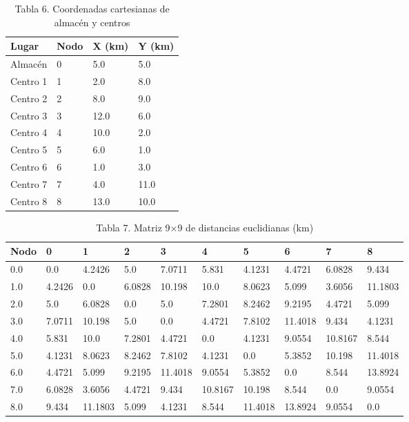 \begin{table}[htbp]
  \centering
  \caption{Tabla 6. Coordenadas cartesianas de almacén y centros}
  \label{tab:tabla-6-coordenadas}
  \begin{tabular}{llll}
    \toprule
    Lugar & Nodo & X (km) & Y (km) \\
    \midrule
    Almacén & 0 & 5.0 & 5.0 \\
    Centro 1 & 1 & 2.0 & 8.0 \\
    Centro 2 & 2 & 8.0 & 9.0 \\
    Centro 3 & 3 & 12.0 & 6.0 \\
    Centro 4 & 4 & 10.0 & 2.0 \\
    Centro 5 & 5 & 6.0 & 1.0 \\
    Centro 6 & 6 & 1.0 & 3.0 \\
    Centro 7 & 7 & 4.0 & 11.0 \\
    Centro 8 & 8 & 13.0 & 10.0 \\
    \bottomrule
  \end{tabular}
\end{table}

\begin{table}[htbp]
  \centering
  \caption{Tabla 7. Matriz 9×9 de distancias euclidianas (km)}
  \label{tab:tabla-7-matriz-distancias}
  \begin{tabular}{llllllllll}
    \toprule
    Nodo & 0 & 1 & 2 & 3 & 4 & 5 & 6 & 7 & 8 \\
    \midrule
    0.0 & 0.0 & 4.2426 & 5.0 & 7.0711 & 5.831 & 4.1231 & 4.4721 & 6.0828 & 9.434 \\
    1.0 & 4.2426 & 0.0 & 6.0828 & 10.198 & 10.0 & 8.0623 & 5.099 & 3.6056 & 11.1803 \\
    2.0 & 5.0 & 6.0828 & 0.0 & 5.0 & 7.2801 & 8.2462 & 9.2195 & 4.4721 & 5.099 \\
    3.0 & 7.0711 & 10.198 & 5.0 & 0.0 & 4.4721 & 7.8102 & 11.4018 & 9.434 & 4.1231 \\
    4.0 & 5.831 & 10.0 & 7.2801 & 4.4721 & 0.0 & 4.1231 & 9.0554 & 10.8167 & 8.544 \\
    5.0 & 4.1231 & 8.0623 & 8.2462 & 7.8102 & 4.1231 & 0.0 & 5.3852 & 10.198 & 11.4018 \\
    6.0 & 4.4721 & 5.099 & 9.2195 & 11.4018 & 9.0554 & 5.3852 & 0.0 & 8.544 & 13.8924 \\
    7.0 & 6.0828 & 3.6056 & 4.4721 & 9.434 & 10.8167 & 10.198 & 8.544 & 0.0 & 9.0554 \\
    8.0 & 9.434 & 11.1803 & 5.099 & 4.1231 & 8.544 & 11.4018 & 13.8924 & 9.0554 & 0.0 \\
    \bottomrule
  \end{tabular}
\end{table}
